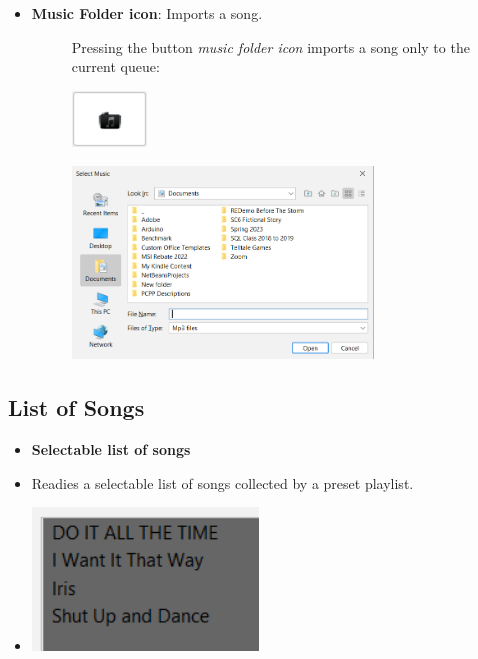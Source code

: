 \documentclass{article}
\begin{document}
\begin{itemize}
    \clearpage
    
        \item \textbf{Music Folder icon}: Imports a song.
    \begin{description}
        \item[] Pressing the button \textit{music folder icon} imports a song only to the current queue:
        \item[] \includegraphics[width=2cm]{Images/musicFolderIconBtn.png}
        \item[] \includegraphics[width=8cm]{Images/musicFileSearch.png}
    \end{description}

\end{itemize}

\subsection{List of Songs}

\begin{itemize}
    \item \textbf{Selectable list of songs}
        \item[] Readies a selectable list of songs collected by a preset playlist.
        \item[] \includegraphics[width=6cm]{Images/ListOfSongs.png}
\end{itemize}
\end{document}
